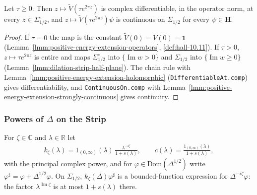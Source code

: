 \begin{lemma}
    \label{lmm:dilated-extension-analytic}
    \leanok
    Let $\tau \ge 0$. Then $z \mapsto \widetilde{V}(\tau e^{2\pi z})$ is complex differentiable, in the operator norm, at every $z \in \Sigma^\circ_{1/2}$, and $z \mapsto \widetilde{V}(\tau e^{2\pi z})\psi$ is continuous on $\Sigma_{1/2}$ for every $\psi \in \mathbf{H}$.
\end{lemma}
\begin{proof}
    \leanok
    If $\tau = 0$ the map is the constant $\widetilde{V}(0) = V(0) = \mathbf{1}$ (Lemma~\ref{lmm:positive-energy-extension-operators}, \ref{def:hall-10.11}). If $\tau > 0$, $z \mapsto \tau e^{2\pi z}$ is entire and maps $\Sigma^\circ_{1/2}$ into $\{\operatorname{Im} w > 0\}$ and $\Sigma_{1/2}$ into $\{\operatorname{Im} w \ge 0\}$ (Lemma~\ref{lmm:dilation-strip-half-plane}). The chain rule with Lemma~\ref{lmm:positive-energy-extension-holomorphic} (\texttt{DifferentiableAt.comp}) gives differentiability, and \texttt{ContinuousOn.comp} with Lemma~\ref{lmm:positive-energy-extension-strongly-continuous} gives continuity.
\end{proof}

\subsubsection{Powers of $\Delta$ on the Strip}

For $\zeta \in \mathbb{C}$ and $\lambda \in \mathbb{R}$ let
\begin{align}
    k_\zeta(\lambda) = 1_{(0,\infty)}(\lambda)\,\frac{\lambda^{-i\zeta}}{1 + s(\lambda)}, \qquad c(\lambda) = \frac{1_{(0,\infty)}(\lambda)}{1 + s(\lambda)},
\end{align}
with the principal complex power, and for $\varphi \in \text{Dom}(\Delta^{1/2})$ write $\varphi^\sharp = \varphi + \Delta^{1/2}\varphi$. On $\Sigma_{1/2}$, $k_\zeta(\Delta)\varphi^\sharp$ is a bounded-function expression for $\Delta^{-i\zeta}\varphi$: the factor $\lambda^{\operatorname{Im}\zeta}$ is at most $1 + s(\lambda)$ there.

